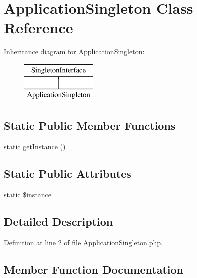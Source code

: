 \hypertarget{class_application_singleton}{}\section{Application\+Singleton Class Reference}
\label{class_application_singleton}
Inheritance diagram for Application\+Singleton\+:\begin{figure}[H]
\begin{center}
\leavevmode
\includegraphics[height=2.000000cm]{class_application_singleton}
\end{center}
\end{figure}
\subsection*{Static Public Member Functions}
\begin{DoxyCompactItemize}
\item 
static \hyperlink{class_application_singleton_ac93fbec81f07e5d15f80db907e63dc10}{get\+Instance} ()
\end{DoxyCompactItemize}
\subsection*{Static Public Attributes}
\begin{DoxyCompactItemize}
\item 
static \hyperlink{class_application_singleton_a9cfc19b3b4f25b2a9007673c57d2f58c}{\$instance}
\end{DoxyCompactItemize}


\subsection{Detailed Description}


Definition at line 2 of file Application\+Singleton.\+php.



\subsection{Member Function Documentation}
\hypertarget{class_application_singleton_ac93fbec81f07e5d15f80db907e63dc10}{}
